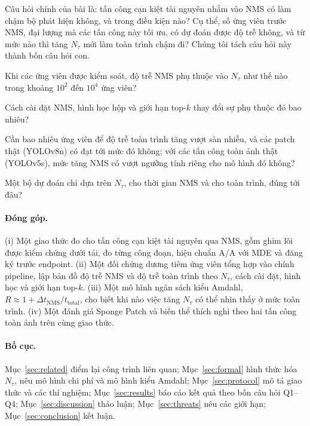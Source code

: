 \documentclass[a4paper,fleqn]{cas-dc}
\newcommand{\Ntau}{N_{\tau}}
\begin{document}
Câu hỏi chính của bài là: tấn công cạn kiệt tài nguyên nhắm vào NMS có làm chậm bộ phát hiện không, và trong điều kiện nào? Cụ thể, số ứng viên trước NMS, đại lượng mà các tấn công này tối ưu, có dự đoán được độ trễ không, và từ mức nào thì tăng $\Ntau$ mới làm toàn trình chậm đi? Chúng tôi tách câu hỏi này thành bốn câu hỏi con.
\begin{description}[leftmargin=2.5em,labelwidth=2.2em,itemsep=2pt]
\item[Q1] Khi các ứng viên được kiểm soát, độ trễ NMS phụ thuộc vào $\Ntau$ như thế nào trong khoảng $10^2$ đến $10^4$ ứng viên?
\item[Q2] Cách cài đặt NMS, hình học hộp và giới hạn top-$k$ thay đổi sự phụ thuộc đó bao nhiêu?
\item[Q3] Cần bao nhiêu ứng viên để độ trễ toàn trình tăng vượt sàn nhiễu, và các patch thật (YOLOv8n) có đạt tới mức đó không; với các tấn công toàn ảnh thật (YOLOv5s), mức tăng NMS có vượt ngưỡng tính riêng cho mô hình đó không?
\item[Q4] Một bộ dự đoán chỉ dựa trên $\Ntau$, cho thời gian NMS và cho toàn trình, đúng tới đâu?
\end{description}

\paragraph{Đóng góp.}
(i) Một giao thức đo cho tấn công cạn kiệt tài nguyên qua NMS, gồm ghim lõi được kiểm chứng dưới tải, đo từng công đoạn, hiệu chuẩn A/A với MDE và đăng ký trước endpoint. (ii) Một đối chứng dương tiêm ứng viên tổng hợp vào chính pipeline, lập bản đồ độ trễ NMS và độ trễ toàn trình theo $\Ntau$, cách cài đặt, hình học và giới hạn top-$k$. (iii) Một mô hình ngân sách kiểu Amdahl, $R \approx 1 + \Delta t_{\mathrm{NMS}}/t_{\mathrm{total}}$, cho biết khi nào việc tăng $\Ntau$ có thể nhìn thấy ở mức toàn trình. (iv) Một đánh giá Sponge Patch và biến thể thích nghi theo hai tấn công toàn ảnh trên cùng giao thức.

\paragraph{Bố cục.}
Mục~\ref{sec:related} điểm lại công trình liên quan; Mục~\ref{sec:formal} hình thức hóa $\Ntau$, nêu mô hình chi phí và mô hình kiểu Amdahl; Mục~\ref{sec:protocol} mô tả giao thức và các thí nghiệm; Mục~\ref{sec:results} báo cáo kết quả theo bốn câu hỏi Q1--Q4; Mục~\ref{sec:discussion} thảo luận; Mục~\ref{sec:threats} nêu các giới hạn; Mục~\ref{sec:conclusion} kết luận.
\end{document}
